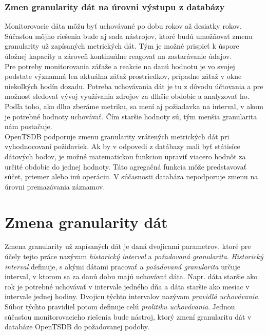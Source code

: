 \documentclass[12pt,twoside,color,cover,table]{fithesis3}
\begin{document}
\subsubsection{Zmen granularity dát na úrovni výstupu z databázy}
Monitorovacie dáta môžu byť uchovávané po dobu rokov až desiatky rokov. Súčasťou môjho riešenia bude aj sada nástrojov, ktoré budú
umožňovať zmenu granularity už zapísaných metrických dát. Tým je možné prispieť k úspore úložnej kapacity a zároveň kontinuálne reagovať na
zastarávanie údajov. 
\\Pre potreby monitorovania záťaže a reakcie na danú hodnotu je vo svojej podstate významná len aktuálna záťaž prostriedkov, prípadne záťaž v okne niekoľkých hodín 
dozadu. Potreba uchovávania dát je tu z dôvodu účtovania a pre možnosť sledovať vývoj využívania zdrojov za dlhšie obdobie a analyzovať ho.
Podľa toho, ako dlho zberáme metriku, sa mení aj požiadavka na interval, v akom je potrebné hodnoty uchovávať. Čím staršie hodnoty sú, tým menšia granularita nám postačuje.
\\OpenTSDB podporuje zmenu granularity vrátených metrických dát pri vyhodnocovaní požidaviek. Ak by v odpovedi z datábazy mali byť státisíce dátových bodov, je možné matematickou funkciou upraviť viacero hodnôt
za určité obdobie  do jednej hodnoty. Táto agregačná funkcia môže predstavovať súčet, priemer alebo inú operáciu. V súčasnosti databáza nepodporuje zmenu na úrovni premazávania záznamov.
  
\section{Zmena granularity dát}
\label{sec:policy}
Zmena granularity už zapísaných dát je daná dvojicami parametrov, ktoré pre účely tejto práce nazývam
\textit{historický interval} a \textit{požadovaná granularita}. \textit{Historický interval} definuje, s akými dátami pracovať a \textit{požadovaná granularita} určuje
interval, v ktorom sa za danú dobu majú uchovávať dáta. Napr. dáta staršie ako rok je potrebné uchovávať v intervale jedného dňa a 
dáta staršie ako mesiac v intervale jednej hodiny. Dvojicu týchto intervalov nazývam \textit{pravidlá uchovávania}. Súbor týchto pravidiel potom definuje celú \textit{prolitiku uchovávania}.
Jednou súčasťou monitorovacieho riešenia bude nástroj, ktorý zmení granularitu dát v databáze OpenTSDB do požadovanej podoby.
\end{document}
